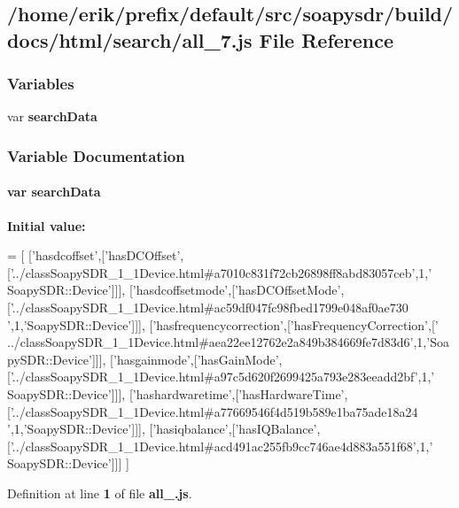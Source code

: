 \subsection{/home/erik/prefix/default/src/soapysdr/build/docs/html/search/all\+\_\+7.js File Reference}
\label{all__7_8js}
\subsubsection*{Variables}
\begin{DoxyCompactItemize}
\item 
var {\bf search\+Data}
\end{DoxyCompactItemize}


\subsubsection{Variable Documentation}
\paragraph[{search\+Data}]{\setlength{\rightskip}{0pt plus 5cm}var search\+Data}\label{all__7_8js_ad01a7523f103d6242ef9b0451861231e}
{\bfseries Initial value\+:}
\begin{DoxyCode}
=
[
  [\textcolor{stringliteral}{'hasdcoffset'},[\textcolor{stringliteral}{'hasDCOffset'},[\textcolor{stringliteral}{'../classSoapySDR\_1\_1Device.html#a7010c831f72cb26898ff8abd83057ceb'},1,\textcolor{stringliteral}{'
      SoapySDR::Device'}]]],
  [\textcolor{stringliteral}{'hasdcoffsetmode'},[\textcolor{stringliteral}{'hasDCOffsetMode'},[\textcolor{stringliteral}{'../classSoapySDR\_1\_1Device.html#ac59df047fc98fbed1799e048af0ae730
      '},1,\textcolor{stringliteral}{'SoapySDR::Device'}]]],
  [\textcolor{stringliteral}{'hasfrequencycorrection'},[\textcolor{stringliteral}{'hasFrequencyCorrection'},[\textcolor{stringliteral}{'
      ../classSoapySDR\_1\_1Device.html#aea22ee12762e2a849b384669fe7d83d6'},1,\textcolor{stringliteral}{'SoapySDR::Device'}]]],
  [\textcolor{stringliteral}{'hasgainmode'},[\textcolor{stringliteral}{'hasGainMode'},[\textcolor{stringliteral}{'../classSoapySDR\_1\_1Device.html#a97c5d620f2699425a793e283eeadd2bf'},1,\textcolor{stringliteral}{'
      SoapySDR::Device'}]]],
  [\textcolor{stringliteral}{'hashardwaretime'},[\textcolor{stringliteral}{'hasHardwareTime'},[\textcolor{stringliteral}{'../classSoapySDR\_1\_1Device.html#a77669546f4d519b589e1ba75ade18a24
      '},1,\textcolor{stringliteral}{'SoapySDR::Device'}]]],
  [\textcolor{stringliteral}{'hasiqbalance'},[\textcolor{stringliteral}{'hasIQBalance'},[\textcolor{stringliteral}{'../classSoapySDR\_1\_1Device.html#acd491ac255fb9cc746ae4d883a551f68'},1,\textcolor{stringliteral}{'
      SoapySDR::Device'}]]]
]
\end{DoxyCode}


Definition at line {\bf 1} of file {\bf all\+\_.\+js}.

